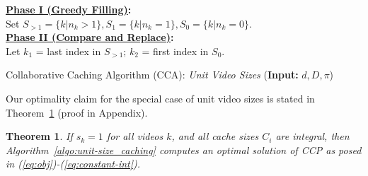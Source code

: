 \documentclass[conference]{IEEEtran}
\newtheorem{theorem}{Theorem}
\begin{document}
\begin{algorithm}
 \textbf{\underline{Phase I (Greedy Filling)}:}\\
 Set $S_{>1} = \{k | n_k>1\}, S_{1} = \{k | n_k=1\}, S_{0} = \{k | n_k=0\}$.\\
 \textbf{\underline{Phase II (Compare and Replace)}:}\\
 Let $k_1$ = last index in $S_{>1}$; $k_2$ = first index in $S_{0}$. \\
\caption{Collaborative Caching Algorithm (CCA): \textit{Unit Video Sizes} (\textbf{Input:} $d,D,\pi$)}
\label{algo:unit-size_caching}
\end{algorithm}

Our optimality claim for the special case of unit video sizes is stated in Theorem~\ref{th:unit-size} (proof in Appendix).

\begin{theorem}
\label{th:unit-size}
If $s_k = 1$ for all videos $k$, and all cache sizes $C_i$ are integral, then Algorithm~\ref{algo:unit-size_caching} computes an optimal solution of CCP as posed in  
(\ref{eq:obj})-(\ref{eq:constant-int}).
\end{theorem}
\end{document}

